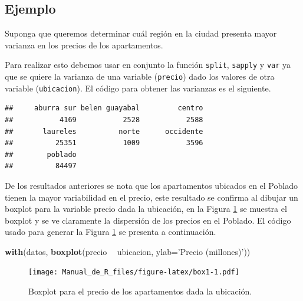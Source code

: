 \documentclass[10pt,]{krantz}
\makeatletter
\newenvironment{Shaded}{\begin{snugshade}}{\end{snugshade}}
\newcommand{\KeywordTok}[1]{\textcolor[rgb]{0.13,0.29,0.53}{\textbf{#1}}}
\newcommand{\DataTypeTok}[1]{\textcolor[rgb]{0.13,0.29,0.53}{#1}}
\newcommand{\StringTok}[1]{\textcolor[rgb]{0.31,0.60,0.02}{#1}}
\newcommand{\OperatorTok}[1]{\textcolor[rgb]{0.81,0.36,0.00}{\textbf{#1}}}
\newcommand{\NormalTok}[1]{#1}
\newenvironment{kframe}{%
\medskip{}
\setlength{\fboxsep}{.8em}
 \def\at@end@of@kframe{}%
 \ifinner\ifhmode%
  \def\at@end@of@kframe{\end{minipage}}%
  \begin{minipage}{\columnwidth}%
 \fi\fi%
 \def\FrameCommand##1{\hskip\@totalleftmargin \hskip-\fboxsep
 \colorbox{shadecolor}{##1}\hskip-\fboxsep
     \hskip-\linewidth \hskip-\@totalleftmargin \hskip\columnwidth}%
 \MakeFramed {\advance\hsize-\width
   \@totalleftmargin\z@ \linewidth\hsize
   \@setminipage}}%
 {\par\unskip\endMakeFramed%
 \at@end@of@kframe}
\renewenvironment{Shaded}{\begin{kframe}}{\end{kframe}}
\makeatother
\begin{document}
\subsection*{Ejemplo}\label{ejemplo-39}


Suponga que queremos determinar cuál región en la ciudad presenta mayor
varianza en los precios de los apartamentos.

Para realizar esto debemos usar en conjunto la función \texttt{split},
\texttt{sapply} y \texttt{var} ya que se quiere la varianza de una
variable (\texttt{precio}) dado los valores de otra variable
(\texttt{ubicacion}). El código para obtener las varianzas es el
siguiente.

\begin{Shaded}
\end{Shaded}

\begin{verbatim}
##     aburra sur belen guayabal         centro 
##           4169           2528           2588 
##       laureles          norte      occidente 
##          25351           1009           3596 
##        poblado 
##          84497
\end{verbatim}

De los resultados anteriores se nota que los apartamentos ubicados en el
Poblado tienen la mayor variabilidad en el precio, este resultado se
confirma al dibujar un boxplot para la variable precio dada la
ubicación, en la Figura \ref{fig:box1} se muestra el boxplot y se ve
claramente la dispersión de los precios en el Poblado. El código usado
para generar la Figura \ref{fig:box1} se presenta a continuación.

\begin{Shaded}
\begin{Highlighting}[]
\KeywordTok{with}\NormalTok{(datos, }\KeywordTok{boxplot}\NormalTok{(precio }\OperatorTok{~}\StringTok{ }\NormalTok{ubicacion, }\DataTypeTok{ylab=}\StringTok{'Precio (millones)'}\NormalTok{))}
\end{Highlighting}
\end{Shaded}

\begin{figure}
\centering
\texttt{[image: Manual\_de\_R\_files/figure-latex/box1-1.pdf]}
\caption{\label{fig:box1}Boxplot para el precio de los apartamentos dada la
ubicación.}
\end{figure}
\end{document}
